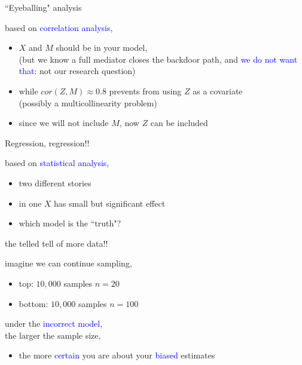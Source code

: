 %
%
\begin{lhframe}[rhgraphic={\texttt{[image: pipefork1\_panel.pdf]}}]
	{``Eyeballing" analysis}
	
	based on \textcolor{blue}{correlation analysis},
	\begin{itemize}
		\item $X$ and $M$ should be in your model,\\
		{\small (but we know a full mediator closes the backdoor path, and \textcolor{blue}{we do not want that}: not our research question)}
		\item while $cor(Z, M)\approx 0.8$ prevents from using $Z$ as a covariate \\
		{\small (possibly a multicollinearity problem)}
		\item since we will not include $M$, now $Z$ can be included
	\end{itemize}
\end{lhframe}
%
%
\begin{lhframe}[rhgraphic={\texttt{[image: pipefork1\_reg.png]}}]
	{Regression, regression!!}
	
	based on \textcolor{blue}{statistical analysis},
	\begin{itemize}
		\item two different stories
		\item in one $X$ has small but significant effect
		\item which model is the ``truth"?
	\end{itemize}
\end{lhframe}
%
%
\begin{lhframe}[rhgraphic={\texttt{[image: pipefork1\_samplesize.pdf]}}]
	{the telled tell of more data!!}
	
	imagine we can continue sampling,
	\begin{itemize}
		\item top: $10,000$ samples $n=20$
		\item bottom: $10,000$ samples $n=100$
	\end{itemize}
	
	under the \textcolor{blue}{incorrect model}, \\
	the larger the sample size,
	\begin{itemize}
		\item the more \textcolor{blue}{certain} you are about your \textcolor{blue}{biased} estimates
	\end{itemize}
\end{lhframe}
